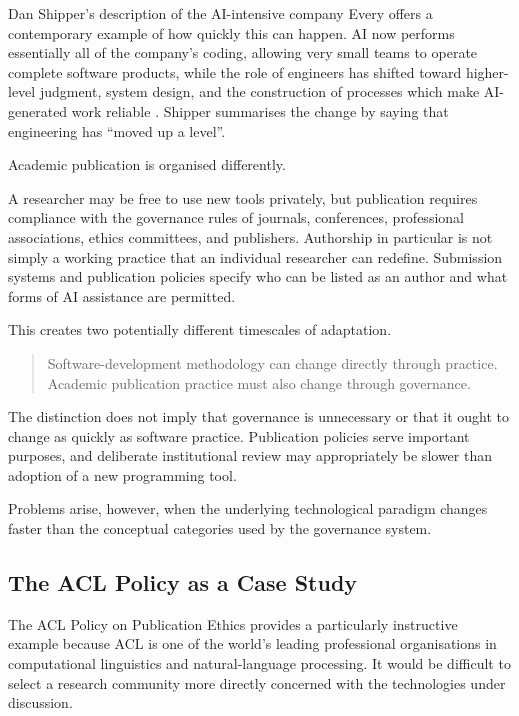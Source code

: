 Dan Shipper's description of the AI-intensive company Every offers a contemporary example of how quickly this can happen. AI now performs essentially all of the company's coding, allowing very small teams to operate complete software products, while the role of engineers has shifted toward higher-level judgment, system design, and the construction of processes which make AI-generated work reliable \citep{newton2026editorclone}. Shipper summarises the change by saying that engineering has ``moved up a level''.

Academic publication is organised differently.

A researcher may be free to use new tools privately, but publication requires compliance with the governance rules of journals, conferences, professional associations, ethics committees, and publishers. Authorship in particular is not simply a working practice that an individual researcher can redefine. Submission systems and publication policies specify who can be listed as an author and what forms of AI assistance are permitted.

This creates two potentially different timescales of adaptation.

\begin{quote}
Software-development methodology can change directly through practice. Academic publication practice must also change through governance.
\end{quote}

The distinction does not imply that governance is unnecessary or that it ought to change as quickly as software practice. Publication policies serve important purposes, and deliberate institutional review may appropriately be slower than adoption of a new programming tool.

Problems arise, however, when the underlying technological paradigm changes faster than the conceptual categories used by the governance system.


\subsection{The ACL Policy as a Case Study}

The ACL Policy on Publication Ethics provides a particularly instructive example because ACL is one of the world's leading professional organisations in computational linguistics and natural-language processing. It would be difficult to select a research community more directly concerned with the technologies under discussion.

